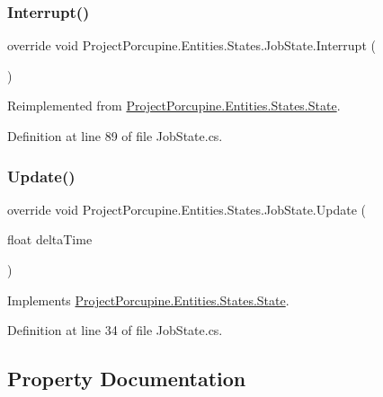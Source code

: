 \subsubsection{\texorpdfstring{Interrupt()}{Interrupt()}}
{\footnotesize\ttfamily override void Project\+Porcupine.\+Entities.\+States.\+Job\+State.\+Interrupt (\begin{DoxyParamCaption}{ }\end{DoxyParamCaption})\hspace{0.3cm}{\ttfamily [virtual]}}



Reimplemented from \hyperlink{class_project_porcupine_1_1_entities_1_1_states_1_1_state_a82fba061891136da0cc359c54337d0be}{Project\+Porcupine.\+Entities.\+States.\+State}.



Definition at line 89 of file Job\+State.\+cs.

\mbox{\label{class_project_porcupine_1_1_entities_1_1_states_1_1_job_state_a78be509101aa1172cdac8b0dd90b8412}} 
\subsubsection{\texorpdfstring{Update()}{Update()}}
{\footnotesize\ttfamily override void Project\+Porcupine.\+Entities.\+States.\+Job\+State.\+Update (\begin{DoxyParamCaption}\item[{float}]{delta\+Time }\end{DoxyParamCaption})\hspace{0.3cm}{\ttfamily [virtual]}}



Implements \hyperlink{class_project_porcupine_1_1_entities_1_1_states_1_1_state_a46337df73c448f5dd84e350e987af8b5}{Project\+Porcupine.\+Entities.\+States.\+State}.



Definition at line 34 of file Job\+State.\+cs.



\subsection{Property Documentation}
\mbox{\label{class_project_porcupine_1_1_entities_1_1_states_1_1_job_state_a44e8a9a507572f451211d6dda14d7289}} 
